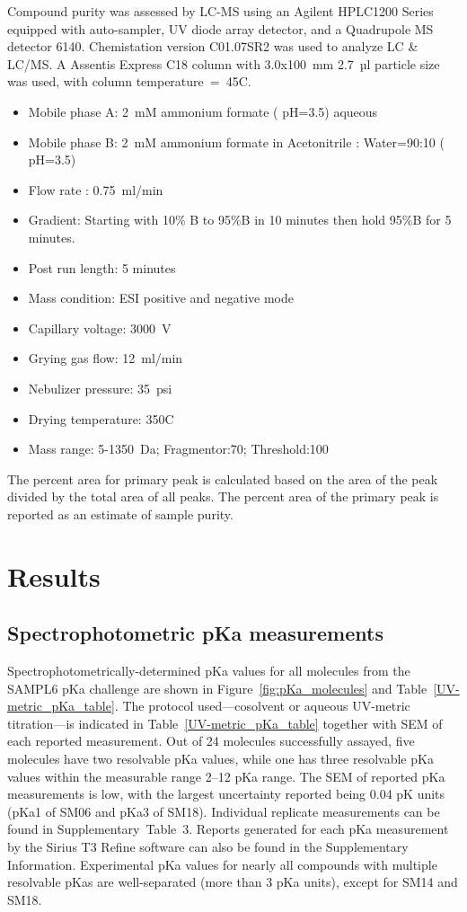 \documentclass[9pt,lineno]{elife}
\begin{document}
Compound purity was assessed by LC-MS using an Agilent HPLC1200 Series equipped with auto-sampler, UV diode array detector, and a Quadrupole MS detector 6140. 
Chemistation version C01.07SR2 was used to analyze LC \& LC/MS.
A Assentis Express C18 column with 3.0x100~mm 2.7~µl particle size was used, with column temperature~=~45\textdegree C.
\begin{itemize}
\item Mobile phase A: 2~mM ammonium formate ( pH=3.5) aqueous
\item Mobile phase B: 2~mM ammonium formate in Acetonitrile : Water=90:10 ( pH=3.5)
\item Flow rate : 0.75~ml/min
\item Gradient: Starting with 10\% B to 95\%B in 10 minutes then hold 95\%B for 5 minutes. 
\item Post run length: 5 minutes 
\item Mass condition: ESI positive and negative mode
\item Capillary voltage: 3000~V
\item Grying gas flow: 12~ml/min
\item Nebulizer pressure: 35~psi
\item Drying temperature: 350\textdegree C
\item Mass range: 5-1350~Da; Fragmentor:70; Threshold:100
\end{itemize}
The percent area for primary peak is calculated based on the area of the peak divided by the total area of all peaks. 
The percent area of the primary peak is reported as an estimate of sample purity.

\section{Results}

\subsection{Spectrophotometric pKa measurements}
Spectrophotometrically-determined pKa values for all molecules from the SAMPL6 pKa challenge are shown in Figure~\ref{fig:pKa_molecules} and Table~\ref{UV-metric_pKa_table}. 
The protocol used---cosolvent or aqueous UV-metric titration---is indicated in Table~\ref{UV-metric_pKa_table} together with SEM of each reported measurement. 
Out of 24 molecules successfully assayed, five molecules have two resolvable pKa values, while one has three resolvable pKa values within the measurable range 2--12 pKa range. 
The SEM of reported pKa measurements is low, with the largest uncertainty reported being 0.04 pK units (pKa1 of SM06 and pKa3 of SM18). 
Individual replicate measurements can be found in Supplementary~Table~3. 
Reports generated for each pKa measurement by the Sirius T3 Refine software can also be found in the Supplementary Information. 
Experimental pKa values for nearly all compounds with multiple resolvable pKas are well-separated (more than 3 pKa units), except for SM14 and SM18.
\end{document}
